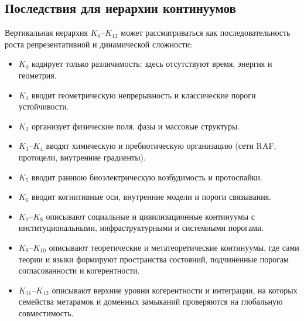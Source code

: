 \subsection{Последствия для иерархии континуумов}

Вертикальная иерархия \(K_0\)–\(K_{12}\) может рассматриваться как последовательность
роста репрезентативной и динамической сложности:

\begin{itemize}
    \item \(K_0\) кодирует только различимость; здесь отсутствуют время, энергия и геометрия.
    \item \(K_1\) вводит геометрическую непрерывность и классические пороги устойчивости.
    \item \(K_2\) организует физические поля, фазы и массовые структуры.
    \item \(K_3\)–\(K_4\) вводят химическую и пребиотическую организацию
          (сети RAF, протоцели, внутренние градиенты).
    \item \(K_5\) вводит раннюю биоэлектрическую возбудимость и протоспайки.
    \item \(K_6\) вводит когнитивные оси, внутренние модели и пороги связывания.
    \item \(K_7\)–\(K_8\) описывают социальные и цивилизационные континуумы
          с институциональными, инфраструктурными и системными порогами.
    \item \(K_9\)–\(K_{10}\) описывают теоретические и метатеоретические континуумы,
          где сами теории и языки формируют пространства состояний,
          подчинённые порогам согласованности и когерентности.
    \item \(K_{11}\)–\(K_{12}\) описывают верхние уровни когерентности и интеграции,
          на которых семейства метарамок и доменных замыканий проверяются
          на глобальную совместимость.
\end{itemize}

